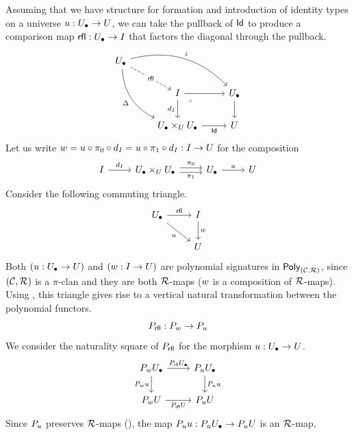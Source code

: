 Assuming that we have structure for formation and introduction of
identity types on a universe ${u} : {U_\bullet} \to U$,
we can take the pullback of $\mathsf{Id}$ to produce a comparison map
$\mathop{\mathsf{rfl}} : {U_\bullet} \to I$ that factors the diagonal through the pullback.
\[\begin{tikzcd}
  \Ulow && \\
  & I & \Ulow \\
  & {\Ulow \times_\U \Ulow} & \U
  \arrow["\rfl"{description}, dashed, from=1-1, to=2-2]
  \arrow["i", bend left, from=1-1, to=2-3]
  \arrow["\Delta"', bend right, from=1-1, to=3-2]
  \arrow[from=2-2, to=2-3]
  \arrow["d_I"', from=2-2, to=3-2]
  \arrow["\lrcorner"{anchor=center, pos=0.125}, draw=none, from=2-2, to=3-3]
  \arrow[from=2-3, to=3-3]
  \arrow["\Id"', from=3-2, to=3-3]
\end{tikzcd}\]
Let us write ${w} = {u} \circ \pi_0 \circ d_I = {u} \circ \pi_1 \circ d_I : I \to U$ for the composition 
\[ \begin{tikzcd}
	I & {\Ulow \times_\U \Ulow} & \Ulow & \U
	\arrow["{d_I}", from=1-1, to=1-2]
	\arrow["{\pi_0}", shift left, from=1-2, to=1-3]
	\arrow["{\pi_1}"', shift right, from=1-2, to=1-3]
	\arrow["\uu", from=1-3, to=1-4]
\end{tikzcd}\]
Consider the following commuting triangle.
\[ \begin{tikzcd}
	\Ulow & I \\
	& \U
	\arrow["\rfl", from=1-1, to=1-2]
	\arrow["{\uu}"', from=1-1, to=2-2]
	\arrow["\pp", from=1-2, to=2-2]
\end{tikzcd} \]
Both $({u} : {U_\bullet} \to U)$ and $({w} : I \to U)$ are
polynomial signatures in $\mathsf{Poly}_{(\mathcal{C},\mathcal{R})}$,
since $(\mathcal{C},\mathcal{R})$ is a $\pi$-clan and they are both $\mathcal{R}$-maps
(${w}$ is a composition of $\mathcal{R}$-maps).
Using ,
this triangle gives rise to a vertical natural transformation
between the polynomial functors.
\[P_{\mathop{\mathsf{rfl}}} : P_{{w}} \to P_{{u}}\]
We consider the naturality square of $P_{\mathop{\mathsf{rfl}}}$
for the morphism ${u} : {U_\bullet} \to U$.
\[ \begin{tikzcd}
	{ P_{\pp} \Ulow} & {P_{\uu} \Ulow} \\
	{ P_{\pp} \U} & {P_{\uu} \U}
	\arrow["{{P_{\rfl} \Ulow}}", from=1-1, to=1-2]
	\arrow["{{ P_{\pp} \uu}}"', from=1-1, to=2-1]
	\arrow["{{P_{\uu} \uu}}", from=1-2, to=2-2]
	\arrow["{{P_{\rfl} \U}}"', from=2-1, to=2-2]
\end{tikzcd} \]
Since $P_{u}$ preserves $\mathcal{R}$-maps
(),
the map $P_{u} {u} : P_{u} {U_\bullet} \to P_{u} U$ is an $\mathcal{R}$-map,
